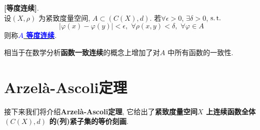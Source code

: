 	\begin{defn}\label{def 1.7.3}
		\textbf{[等度连续]}. \\
		设$(X , \rho)$ 为紧致度量空间, $A \subset (C(X) , d)$. 若$\forall \epsilon > 0$, $\exists \delta > 0$, $\operatorname{s.t.}$
		\[ \left| \varphi(x) - \varphi(y) \right| < \epsilon , \,\, \forall \rho(x , y) < \delta , \,\, \forall \varphi \in A \]
		则称\underline{\textcolor{blue}{\textbf{$A$ 等度连续}}}.
		
		\vspace{2em}
		
		\begin{rmk}
			相当于在数学分析\textbf{函数一致连续}的概念上增加了对$A$ 中所有函数的一致性.
		\end{rmk}
	\end{defn}

\newpage

\section{Arzel\`{a}-Ascoli定理}
	接下来我们将介绍\textbf{Arzel\`{a}-Ascoli定理}, 它给出了\textbf{紧致度量空间$X$ 上连续函数全体$(C(X) , d)$ 的(列)紧子集的等价刻画}.
	
